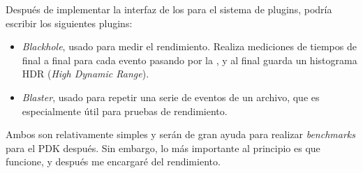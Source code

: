 Después de implementar la interfaz de los \connectors para el sistema de
plugins, podría escribir los siguientes plugins:

\begin{itemize}
    \item \emph{Blackhole}, usado para medir el rendimiento. Realiza mediciones
        de tiempos de final a final para cada evento pasando por la \pipeline, y
        al final guarda un histograma HDR (\emph{High Dynamic Range}).

    \item \emph{Blaster}, usado para repetir una serie de eventos de un archivo,
        que es especialmente útil para pruebas de rendimiento.

\end{itemize}

Ambos \connectors son relativamente simples y serán de gran ayuda para realizar
\emph{benchmarks} para el PDK después. Sin embargo, lo más importante al
principio es que funcione, y después me encargaré del rendimiento.
